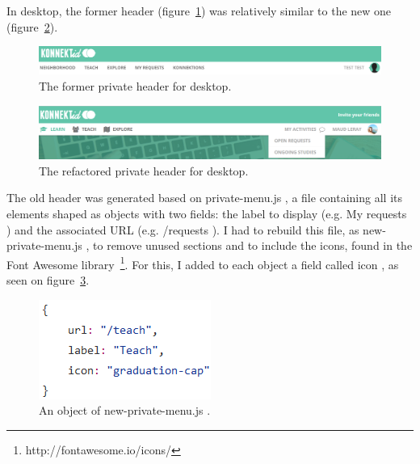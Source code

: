 In desktop, the former header ({\sc figure}~\ref{fig:oldNavDesktop}) was relatively similar to the new one ({\sc figure}~\ref{fig:newNavDesktop}). 

\begin{figure}[H]
    \centering
    \includegraphics[scale=0.3]{figure/oldNavDesktop.png}
    \caption{The former private header for desktop.}
    \label{fig:oldNavDesktop}
\end{figure}

\begin{figure}[H]
    \centering
    \includegraphics[scale=0.47]{figure/newNavDesktop.png}
    \caption{The refactored private header for desktop.}
    \label{fig:newNavDesktop}
\end{figure}

The old header was generated based on \guillemotleft{} private-menu.js \guillemotright{}, a file containing all its elements shaped as objects with two fields: the label to display (e.g. \guillemotleft{} My requests \guillemotright{}) and the associated URL (e.g. \guillemotleft{} /requests \guillemotright{}). I had to rebuild this file, as \guillemotleft{} new-private-menu.js \guillemotright{}, to remove unused sections and to include the icons, found in the Font Awesome library~\footnote{http://fontawesome.io/icons/}. For this, I added to each object a field called \guillemotleft{} icon \guillemotright{}, as seen on {\sc figure}~\ref{fig:icon}.

\begin{figure}[H]
    \centering
    \includegraphics{figure/icon.png}
    \caption{An object of \guillemotleft{} new-private-menu.js \guillemotright{}.}
    \label{fig:icon}
\end{figure}

